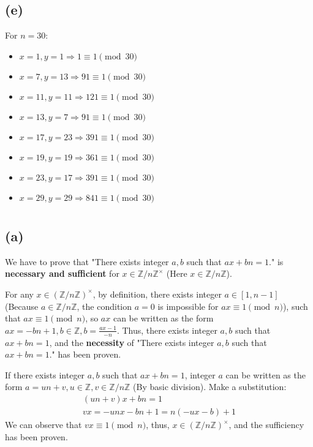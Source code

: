 \documentclass[12pt]{article}
\begin{document}
\subsection*{(e)}
For $n=30$:
\begin{itemize}
    \item $x=1,y=1\Rightarrow1\equiv 1\pmod{30}$
    \item $x=7,y=13\Rightarrow91\equiv 1\pmod{30}$
    \item $x=11,y=11\Rightarrow121\equiv 1\pmod{30}$
    \item $x=13,y=7\Rightarrow91\equiv 1\pmod{30}$
    \item $x=17,y=23\Rightarrow391\equiv 1\pmod{30}$
    \item $x=19,y=19\Rightarrow361\equiv 1\pmod{30}$
    \item $x=23,y=17\Rightarrow391\equiv 1\pmod{30}$
    \item $x=29,y=29\Rightarrow841\equiv 1\pmod{30}$
\end{itemize}
\section{}
\subsection*{(a)}
We have to prove that "There exists integer $a,b$ such that $ax+bn=1$." is \textbf{necessary and sufficient} for $x\in\mathbb{Z}/n\mathbb{Z}^{\times}$ (Here $x\in\mathbb{Z}/n\mathbb{Z}$).

For any $x\in(\mathbb{Z}/n\mathbb{Z})^{\times}$, by definition, there exists integer $a\in[1,n-1]$ (Because $a\in\mathbb{Z}/n\mathbb{Z}$, the condition $a=0$ is impossible for $ax\equiv 1\pmod{n}$), such that $ax\equiv 1\pmod{n}$, so $ax$ can be written as the form $ax=-bn+1,b\in\mathbb{Z},b=\frac{ax-1}{-n}$. Thus, there exists integer $a,b$ such that $ax+bn=1$, and the \textbf{necessity} of "There exists integer $a,b$ such that $ax+bn=1$." has been proven. 

If there exists integer $a,b$ such that $ax+bn=1$, integer $a$ can be written as the form $a=un+v, u\in\mathbb{Z},v\in\mathbb{Z}/n\mathbb{Z}$ (By basic division). Make a substitution:
\begin{align*}
    (un+v)x+bn=1 \\
    vx=-unx-bn+1=n(-ux-b)+1
\end{align*}
We can observe that $vx\equiv 1\pmod{n}$, thus, $x\in(\mathbb{Z}/n\mathbb{Z})^{\times}$, and the sufficiency has been proven.
\end{document}
